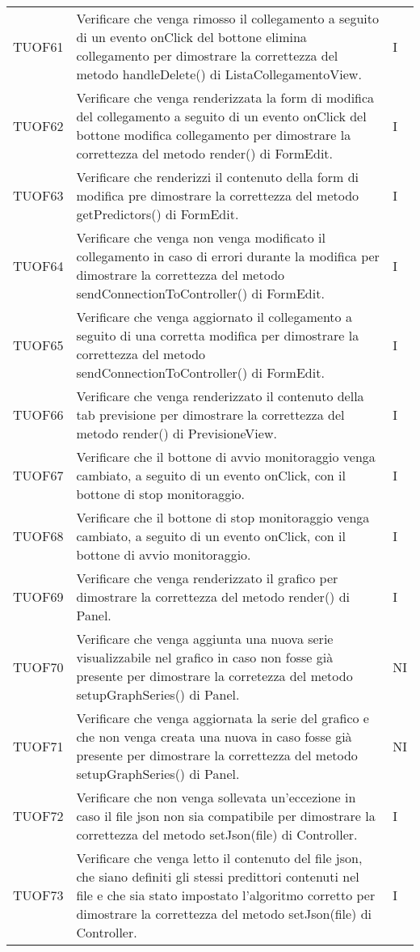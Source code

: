 \begin{longtable}{C{2cm} L{8cm} C{2cm}}
TUOF61 & Verificare che venga rimosso il collegamento a seguito di un evento onClick del bottone elimina collegamento per dimostrare la correttezza del metodo handleDelete() di ListaCollegamentoView. & I \\
TUOF62 & Verificare che venga renderizzata la form di modifica del collegamento a seguito di un evento onClick del bottone modifica collegamento per dimostrare la correttezza del metodo render() di FormEdit. & I \\
TUOF63 & Verificare che renderizzi il contenuto della form di modifica pre dimostrare la correttezza del metodo getPredictors() di FormEdit. & I \\
TUOF64 & Verificare che venga non venga modificato il collegamento in caso di errori durante la modifica per dimostrare la correttezza del metodo sendConnectionToController() di FormEdit. & I \\
TUOF65 & Verificare che venga aggiornato il collegamento a seguito di una corretta modifica per dimostrare la correttezza del metodo sendConnectionToController() di FormEdit. & I \\
TUOF66 & Verificare che venga renderizzato il contenuto della tab previsione per dimostrare la correttezza del metodo render() di PrevisioneView. & I \\
TUOF67 & Verificare che il bottone di avvio monitoraggio venga cambiato, a seguito di un evento onClick, con il bottone di stop monitoraggio. & I \\
TUOF68 & Verificare che il bottone di stop monitoraggio venga cambiato, a seguito di un evento onClick, con il bottone di avvio monitoraggio. & I \\
TUOF69 & Verificare che venga renderizzato il grafico per dimostrare la correttezza del metodo render() di Panel. & I \\
TUOF70 & Verificare che venga aggiunta una nuova serie visualizzabile nel grafico in caso non fosse già presente per dimostrare la corretezza del metodo setupGraphSeries() di Panel. & NI \\
TUOF71 & Verificare che venga aggiornata la serie del grafico e che non venga creata una nuova in caso fosse già presente per dimostrare la correttezza del metodo setupGraphSeries() di Panel. & NI \\
TUOF72 & Verificare che non venga sollevata un'eccezione in caso il file json non sia compatibile per dimostrare la correttezza del metodo setJson(file) di Controller. & I \\
TUOF73 & Verificare che venga letto il contenuto del file json, che siano definiti gli stessi predittori contenuti nel file e che sia stato impostato l'algoritmo corretto per dimostrare la correttezza del metodo setJson(file) di Controller. & I \\

\end{longtable}
